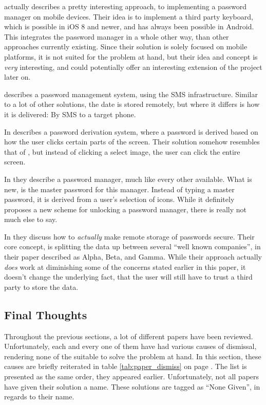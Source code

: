 			\cite{android} actually describes a pretty interesting approach, to implementing a password manager on mobile devices. Their idea is to implement a third party keyboard, which is possible in iOS 8 and newer, and has always been possible in Android. This integrates the password manager in a whole other way, than other approaches currently existing. Since their solution is solely focused on mobile platforms, it is not suited for the problem at hand, but their idea and concept is \emph{very} interesting, and could potentially offer an interesting extension of the project later on.

			\cite{sms} describes a password management system, using the SMS infrastructure. Similar to a lot of other solutions, the date is stored remotely, but where it differs is how it is delivered: By SMS to a target phone. 

			In \cite{screen} describes a password derivation system, where a password is derived based on how the user clicks certain parts of the screen. Their solution somehow resembles that of \cite{stobert2014}, but instead of clicking a select image, the user can click the entire screen.

			In \cite{bicakci} they describe a password manager, much like every other available. What is new, is the master password for this manager. Instead of typing a master password, it is derived from a user's selection of icons. While it definitely proposes a new scheme for unlocking a password manager, there is really not much else to say.

			In \cite{nejad2012} they discuss how to \emph{actually} make remote storage of passwords secure. Their core concept, is splitting the data up between several ``well known companies'', in their paper described as Alpha, Beta, and Gamma. While their approach actually \emph{does} work at diminishing some of the concerns stated earlier in this paper, it doesn't change the underlying fact, that the user will still have to trust a third party to store the data.


		\subsection{Final Thoughts}
			Throughout the previous sections, a lot of different papers have been reviewed. Unfortunately, each and every one of them have had various causes of dismissal, rendering none of the suitable to solve the problem at hand. In this section, these causes are briefly reiterated in table \ref{tab:paper_dismiss} on page \pageref{tab:paper_dismiss}. The list is presented as the same order, they appeared earlier. Unfortunately, not all papers have given their solution a name. These solutions are tagged as ``None Given'', in regards to their name. 

